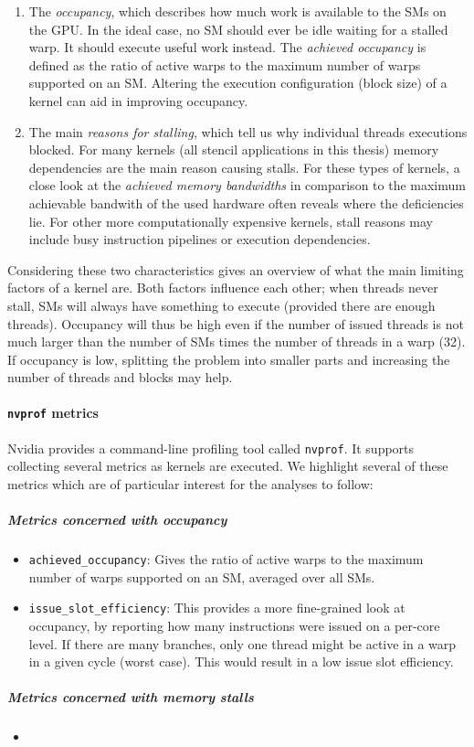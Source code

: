 \begin{enumerate}
	\item The \emph{occupancy}, which describes how much work is available to the SMs on the GPU. In the ideal case, no SM should ever be idle waiting for a stalled warp. It should execute useful work instead. The \emph{achieved occupancy} is defined as the ratio of active warps to the maximum number of warps supported on an SM. Altering the execution configuration (block size) of a kernel can aid in improving occupancy.
	\item The main \emph{reasons for stalling}, which tell us why individual threads executions blocked. For many kernels (all stencil applications in this thesis) memory dependencies are the main reason causing stalls. For these types of kernels, a close look at the \emph{achieved memory bandwidths} in comparison to the maximum achievable bandwith of the used hardware often reveals where the deficiencies lie. For other more computationally expensive kernels, stall reasons may include busy instruction pipelines or execution dependencies.
\end{enumerate}

Considering these two characteristics gives an overview of what the main limiting factors of a kernel are. Both factors influence each other; when threads never stall, SMs will always have something to execute (provided there are enough threads). Occupancy will thus be high even if the number of issued threads is not much larger than the number of SMs times the number of threads in a warp (32). If occupancy is low, splitting the problem into smaller parts and increasing the number of threads and blocks may help.

\paragraph{\texttt{nvprof} metrics} Nvidia provides a command-line profiling tool called \texttt{nvprof}. It supports collecting several metrics as kernels are executed. We highlight several of these metrics which are of particular interest for the analyses to follow:

\subparagraph{Metrics concerned with occupancy}
\begin{itemize}
	\item \texttt{achieved\_occupancy}: Gives the ratio of active warps to the maximum number of warps supported on an SM, averaged over all SMs.
	\item \texttt{issue\_slot\_efficiency}: This provides a more fine-grained look at occupancy, by reporting how many instructions were issued on a per-core level. If there are many branches, only one thread might be active in a warp in a given cycle (worst case). This would result in a low issue slot efficiency.
\end{itemize}

\subparagraph{Metrics concerned with memory stalls}
\begin{itemize}
	\item
\end{itemize}

